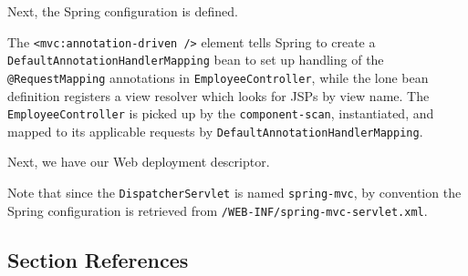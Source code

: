\documentclass{article}
\begin{document}
Next, the Spring configuration is defined.



The \texttt{<mvc:annotation-driven />} element tells Spring to create a \texttt{DefaultAnnotationHandlerMapping} bean to set up handling of the \texttt{@RequestMapping} annotations in \texttt{EmployeeController}, while the lone bean definition registers a view resolver which looks for JSPs by view name.  The \texttt{EmployeeController} is picked up by the \texttt{component-scan}, instantiated, and mapped to its applicable requests by \texttt{DefaultAnnotationHandlerMapping}.

Next, we have our Web deployment descriptor.



Note that since the \texttt{DispatcherServlet} is named \texttt{spring-mvc}, by convention the Spring configuration is retrieved from \texttt{/WEB-INF/spring-mvc-servlet.xml}.

\subsection{Section References}
\end{document}
